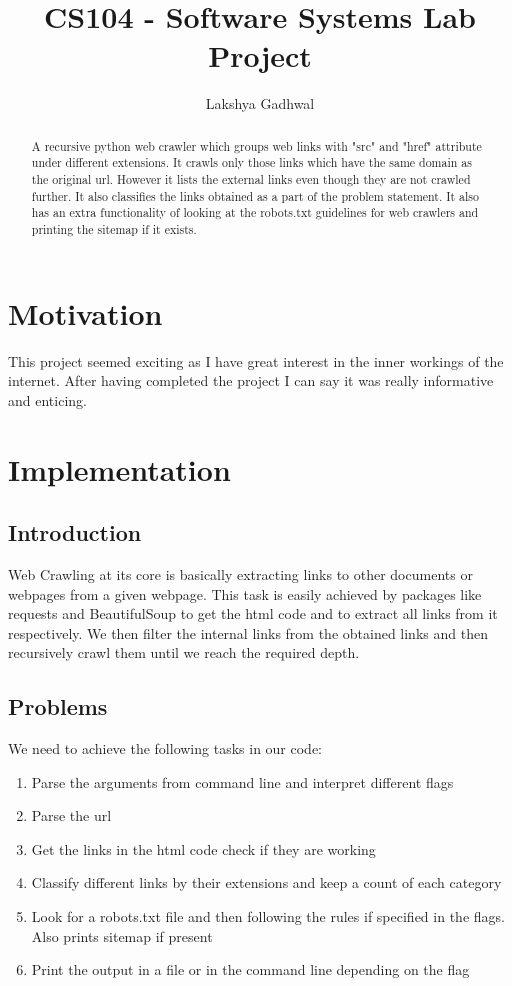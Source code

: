 \documentclass{article}
\title{CS104 - Software Systems Lab Project}
\author{Lakshya Gadhwal}
\begin{document}
\maketitle

\begin{abstract}
A recursive python web crawler which groups web links with "src" and "href" attribute under different extensions. It crawls only those links which have the same domain as the original url. However it lists the external links even though they are not crawled further. It also classifies the links obtained as a part of the problem statement. It also has an extra functionality of looking at the robots.txt guidelines for web crawlers and printing the sitemap if it exists.
\end{abstract}

\section{Motivation}

This project seemed exciting as I have great interest in the inner workings of the internet. After having completed the project I can say it was really informative and enticing.

\section{Implementation}


\subsection{Introduction}
Web Crawling at its core is basically extracting links to other documents or webpages from a given webpage. This task is easily achieved by packages like requests and BeautifulSoup to get the html code and to extract all links from it respectively. We then filter the internal links from the obtained links and then recursively crawl them until we reach the required depth.

\subsection{Problems}

We need to achieve the following tasks in our code:
\begin{enumerate}
    \item Parse the arguments from command line and interpret different flags
    \item Parse the url
    \item Get the links in the html code check if they are working
    \item Classify different links by their extensions and keep a count of each category
    \item Look for a robots.txt file and then following the rules if specified in the flags. Also prints sitemap if present
    \item Print the output in a file or in the command line depending on the flag
\end{enumerate}
\end{document}
